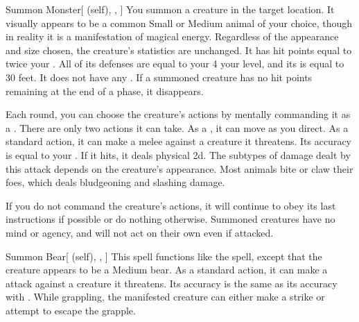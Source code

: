 \lowercase{\hypertarget{spell:Summon Monster}{}}\label{spell:Summon Monster}
\begin{attuneability}[Rank 1]{\hypertarget{spell:Summon Monster}{Summon Monster}}[ (self), , ]
You summon a creature in the target location.
It visually appears to be a common Small or Medium animal of your choice, though in reality it is a manifestation of magical energy.
Regardless of the appearance and size chosen, the creature's statistics are unchanged.
It has hit points equal to twice your .
All of its defenses are equal to your 4 \add your level, and its  is equal to 30 feet.
It does not have any .
If a summoned creature has no hit points remaining at the end of a phase, it disappears.

Each round, you can choose the creature's actions by mentally commanding it as a .
There are only two actions it can take.
As a , it can move as you direct.
As a standard action, it can make a melee  against a creature it threatens.
Its accuracy is equal to your .
If it hits, it deals physical  \minus2d.
The subtypes of damage dealt by this attack depends on the creature's appearance.
Most animals bite or claw their foes, which deals bludgeoning and slashing damage.

If you do not command the creature's actions, it will continue to obey its last instructions if possible or do nothing otherwise.
Summoned creatures have no mind or agency, and will not act on their own even if attacked.
\end{attuneability}
\vspace{0.25em}



\lowercase{\hypertarget{spell:Summon Bear}{}}\label{spell:Summon Bear}
\begin{attuneability}[Rank 3]{\hypertarget{spell:Summon Bear}{Summon Bear}}[ (self), , ]
This spell functions like the  spell, except that the creature appears to be a Medium bear.
As a standard action, it can make a  attack against a creature it threatens.
Its accuracy is the same as its accuracy with .
While grappling, the manifested creature can either make a strike or attempt to escape the grapple.
\end{attuneability}
\vspace{0.25em}



